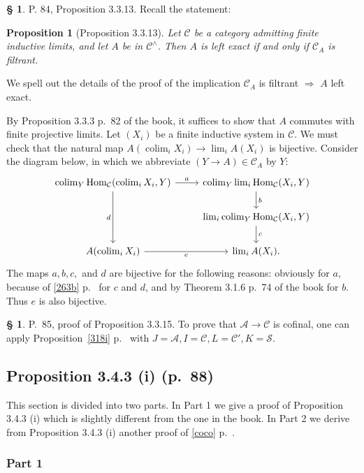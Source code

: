 \documentclass[12pt]{article}%
\newtheorem{prop}[thm]{Proposition}
\theoremstyle{remark}
\theoremstyle{definition}
\newtheorem{s}[thm]{\S}%
\newcommand{\cc}{\mathcal}
\newcommand{\A}{\mathcal A}
\newcommand{\C}{\mathcal C}
\newcommand{\then}{\Rightarrow}
\DeclareMathOperator*{\colim}{colim}
\DeclareMathOperator{\Hom}{Hom}%
\begin{document}
\begin{s}
P. 84, Proposition 3.3.13. Recall the statement:

\begin{prop}[Proposition 3.3.13]
Let $\C$ be a category admitting finite inductive limits, and let $A$ be in $\C^\wedge$. Then $A$ is left exact if and only if $\C_A$ is filtrant.
\end{prop}

We spell out the details of the proof of the implication $\C_A$ is filtrant $\then$ $A$ left exact.

By Proposition 3.3.3 p.~82 of the book, it suffices to show that $A$ commutes with finite projective limits. Let $(X_i)$ be a finite inductive system in $\C$. We must check that the natural map $A(\colim_i X_i)\to\lim_iA(X_i)$ is bijective. Consider the diagram below, in which we abbreviate $(Y\to A)\in\C_A$ by $Y$: 
$$
\begin{tikzcd}
\colim_Y\Hom_\C(\colim_iX_i,Y)\ar{r}{a}\ar{dd}[swap]{d}&\colim_Y\lim_i\Hom_\C(X_i,Y)\ar{d}{b}\\ 
{}&\lim_i\colim_Y\Hom_\C(X_i,Y)\ar{d}{c}\\ 
A(\colim_iX_i)\ar{r}[swap]{e}&\lim_iA(X_i).
\end{tikzcd}
$$ 
The maps $a,b,c,$ and $d$ are bijective for the following reasons: obviously for $a$, because of \eqref{263b} p.~\pageref{263b} for $c$ and $d$, and by Theorem 3.1.6 p.~74 of the book for $b$. Thus $e$ is also bijective.
\end{s}

%

\begin{s}\label{3315}
P.~85, proof of Proposition 3.3.15. To prove that $\A\to\C$ is cofinal, one can apply Proposition~\ref{318i} p.~\pageref{318i} with $J=\A,I=\C,L=\C',K=\cc S$. 
\end{s}


\subsection{Proposition 3.4.3 (i) (p.~88)}

This section is divided into two parts. In Part 1 we give a proof of Proposition 3.4.3 (i) which is slightly different from the one in the book. In Part 2 we derive from Proposition 3.4.3 (i) another proof of \eqref{coco} p.~\pageref{coco}. 

\subsubsection{Part 1} 
\end{document}
